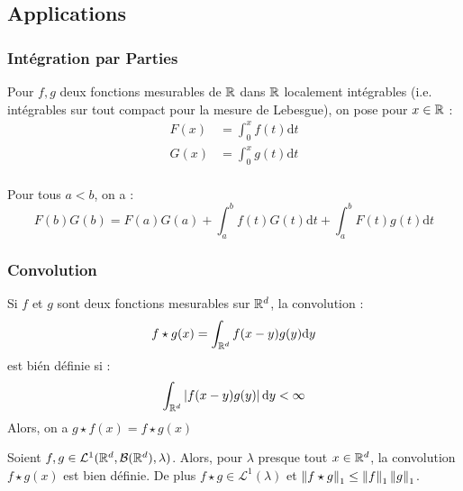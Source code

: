 \documentclass{cours}
\begin{document}
        \subsection{Applications}
        \subsubsection{Intégration par Parties}
        \begin{definition}
            Pour $f, g$ deux fonctions mesurables de $\mathbb{R}$ dans $\mathbb{R}$ localement intégrables (i.e. intégrables sur tout compact pour la mesure de Lebesgue), on pose pour $x \in \mathbb{R}$ :
            \[
                \begin{aligned}
                    F(x) & = \int_{0}^{x}f(t)\mathrm{d}t \\
                    G(x) & = \int_{0}^{x}g(t)\mathrm{d}t \\
                \end{aligned}
            \]
        \end{definition}
        \begin{theorem}[IPP]
            Pour tous $a < b$, on a : 
            \[
                F(b)G(b) = F(a)G(a) + \int_{a}^{b}f(t)G(t)\mathrm{d}t + \int_{a}^{b}F(t)g(t)\mathrm{d}t
            \]            
        \end{theorem}

        \subsubsection{Convolution}
        \begin{definition}
            Si $f$ et $g$ sont deux fonctions mesurables sur $\mathbb{R}^{d}$, la convolution : 
            \[
                f \star g (x) = \int_{\mathbb{R}^{d}} f(x-y)g(y)\mathrm{d}y
            \]
            est bién définie si :
            \[
                \int_{\mathbb{R}^{d}}\left|f(x - y)g(y)\right| \mathrm{d}y < \infty    
            \]
            Alors, on a $g\star f(x)= f\star g(x)$
        \end{definition}

        \begin{proposition}
            Soient $f, g \in \mathcal{L}^{1}(\mathbb{R}^{d}, \mathcal{B}(\mathbb{R}^{d}), \lambda)$. Alors, pour $\lambda$ presque tout $x \in\mathbb{R}^{d}$, la convolution $f \star g(x)$ est bien définie. De plus $f \star g \in \mathcal{L}^{1}(\lambda)$ et $\left\lVert f \star g \right\rVert_{1} \leq \left\lVert f \right\rVert_{1}\left\lVert g \right\rVert_{1}$.
        \end{proposition}
        
\end{document}
